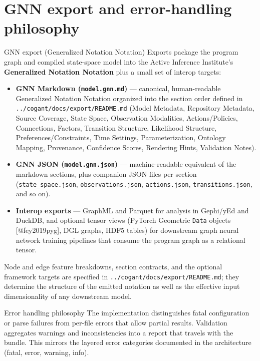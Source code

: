 \documentclass[
  ignorenonframetext,
]{beamer}
\author{\texorpdfstring{}{}}
\date{}
\providecommand{\tightlist}{%
  \setlength{\itemsep}{0pt}\setlength{\parskip}{0pt}}
\begin{document}
\section{GNN export and error-handling
philosophy}\label{gnn-export-and-error-handling-philosophy}

\begin{frame}[fragile]{GNN export (Generalized Notation Notation)}
\protect{}\label{gnn-export-generalized-notation-notation}
Exports package the program graph and compiled state-space model into
the Active Inference Institute's \textbf{Generalized Notation Notation}
plus a small set of interop targets:

\begin{itemize}
\tightlist
\item
  \textbf{GNN Markdown (\texttt{model.gnn.md})} --- canonical,
  human-readable Generalized Notation Notation organized into the
  section order defined in \texttt{../cogant/docs/export/README.md}
  (Model Metadata, Repository Metadata, Source Coverage, State Space,
  Observation Modalities, Actions/Policies, Connections, Factors,
  Transition Structure, Likelihood Structure, Preferences/Constraints,
  Time Settings, Parameterization, Ontology Mapping, Provenance,
  Confidence Scores, Rendering Hints, Validation Notes).
\item
  \textbf{GNN JSON (\texttt{model.gnn.json})} --- machine-readable
  equivalent of the markdown sections, plus companion JSON files per
  section (\texttt{state\_space.json}, \texttt{observations.json},
  \texttt{actions.json}, \texttt{transitions.json}, and so on).
\item
  \textbf{Interop exports} --- GraphML and Parquet for analysis in
  Gephi/yEd and DuckDB, and optional tensor views (PyTorch Geometric
  \texttt{Data} objects {[}@fey2019pyg{]}, DGL graphs, HDF5 tables) for
  downstream graph neural network training pipelines that consume the
  program graph as a relational tensor.
\end{itemize}

Node and edge feature breakdowns, section contracts, and the optional
framework targets are specified in
\texttt{../cogant/docs/export/README.md}; they determine the structure
of the emitted notation as well as the effective input dimensionality of
any downstream model.
\end{frame}

\begin{frame}{Error handling philosophy}
\protect{}\label{error-handling-philosophy}
The implementation distinguishes fatal configuration or parse failures
from per-file errors that allow partial results. Validation aggregates
warnings and inconsistencies into a report that travels with the bundle.
This mirrors the layered error categories documented in the architecture
(fatal, error, warning, info).
\end{frame}
\end{document}
